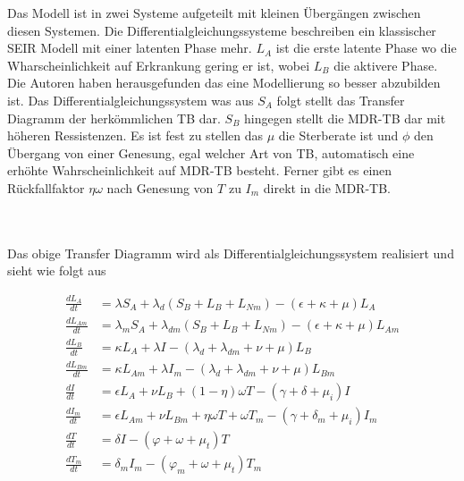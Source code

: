 \documentclass[paper=a4, fontsize=11pt, ngerman, abstract=on]{scrartcl}
\numberwithin{equation}{section} %
\numberwithin{figure}{section} %
\numberwithin{table}{section} %
\begin{document}
\begin{minipage}{0.55\linewidth}
Das Modell ist in zwei Systeme aufgeteilt mit kleinen Übergängen zwischen diesen Systemen. Die Differentialgleichungssysteme beschreiben ein klassischer SEIR Modell mit einer latenten Phase mehr. $L_{A}$ ist die erste latente Phase wo die Wharscheinlichkeit auf Erkrankung gering er ist, wobei $L_{B}$ die aktivere Phase. Die Autoren haben herausgefunden das eine Modellierung so besser abzubilden ist. Das Differentialgleichungssystem was aus $S_{A}$ folgt stellt das Transfer Diagramm der herkömmlichen TB dar. $S_{B}$ hingegen stellt die MDR-TB dar mit höheren Ressistenzen. Es ist fest zu stellen das $\mu$ die Sterberate ist und $\phi$ den Übergang von einer Genesung, egal welcher Art von TB, automatisch eine erhöhte Wahrscheinlichkeit auf MDR-TB besteht. Ferner gibt es einen Rückfallfaktor $\eta \omega$ nach Genesung von $T$ zu $I_{m}$ direkt in die MDR-TB.
\end{minipage}\\\\

Das obige Transfer Diagramm wird als Differentialgleichungssystem realisiert und sieht wie folgt aus

\begin{equation}
\begin{split}
  \frac{dL_{A}}{dt} &= \lambda S_{A} + \lambda_{d}(S_{B} + L_{B} + L_{Nm}) - (\epsilon + \kappa + \mu)L_{A} \\
  \frac{dL_{Am}}{dt} &= \lambda_{m} S_{A} + \lambda_{dm}(S_{B} + L_{B} + L_{Nm}) - (\epsilon + \kappa + \mu)L_{Am} \\
  \frac{dL_{B}}{dt} &= \kappa L_{A} + \lambda I - (\lambda_{d} + \lambda_{dm} + \nu + \mu) L_{B} \\
  \frac{dL_{Bm}}{dt} &= \kappa L_{Am} + \lambda I_{m} - (\lambda_{d} + \lambda _{dm} + \nu + \mu) L_{Bm} \\
  \frac{dI}{dt} &= \epsilon L_{A} + \nu L_{B} + (1 - \eta)\omega T - (\gamma + \delta + \mu_{i})I \\
  \frac{dI_{m}}{dt} &= \epsilon L_{Am} + \nu L_{Bm} + \eta \omega T + \omega T_{m} - (\gamma + \delta_{m} + \mu_{i})I_{m} \\
  \frac{dT}{dt} &= \delta I - (\varphi + \omega + \mu_{t}) T \\
  \frac{dT_{m}}{dt} &= \delta _{m} I_{m} - (\varphi _{m} + \omega + \mu_{t}) T_{m}
\end{split}
\label{eq:dgls-mdr-tb}
\end{equation}
\end{document}
